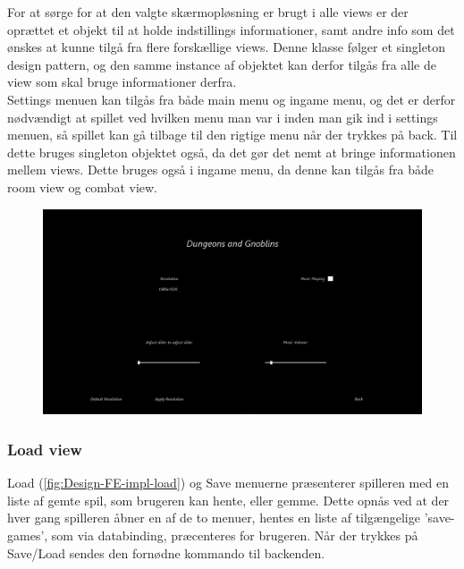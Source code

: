 \noindent For at sørge for at den valgte skærmopløsning er brugt i alle views er der oprættet et objekt til at holde indstillings informationer, samt andre info som det ønskes at kunne tilgå fra flere forskællige views. Denne klasse følger et singleton design pattern, og den samme instance af objektet kan derfor tilgås fra alle de view som skal bruge informationer derfra.\\

\noindent
Settings menuen kan tilgås fra både main menu og ingame menu, og det er derfor nødvændigt at spillet ved hvilken menu man var i inden man gik ind i settings menuen, så spillet kan gå tilbage til den rigtige menu når der trykkes på back. Til dette bruges singleton objektet også, da det gør det nemt at bringe informationen mellem views. Dette bruges også i ingame menu, da denne kan tilgås fra både room view og combat view.

\begin{figure}[h]
\centering
\includegraphics[width = \textwidth]{02-Body/Images/SettingsMenu_final.PNG}
\caption{}
\label{fig:Design-FE-impl-settings}
\end{figure}

\subsubsection{Load view}

Load (\autoref{fig:Design-FE-impl-load}) og Save menuerne præsenterer spilleren med en liste af gemte spil, som brugeren kan hente, eller gemme. Dette opnås ved at der hver gang spilleren åbner en af de to menuer, hentes en liste af tilgængelige 'save-games', som via databinding, præcenteres for brugeren. Når der trykkes på Save/Load sendes den fornødne kommando til backenden.

